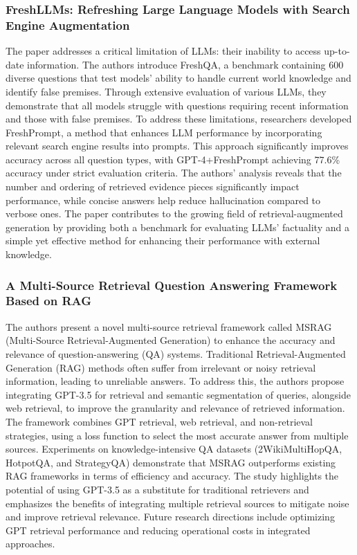 \documentclass[fleqn,moreauthors,10pt]{ds_report}
\begin{document}
\subsubsection{FreshLLMs: Refreshing Large Language Models with Search Engine Augmentation}

The paper addresses a critical limitation of LLMs: their inability to access up-to-date information. The authors introduce FreshQA, a benchmark containing 600 diverse questions that test models’ ability to handle current world knowledge and identify false premises. Through extensive evaluation of various LLMs, they demonstrate that all models struggle with questions requiring recent information and those with false premises.
To address these limitations, researchers developed FreshPrompt, a method that enhances LLM performance by incorporating relevant search engine results into prompts. This approach significantly improves accuracy across all question types, with GPT-4+FreshPrompt achieving 77.6\% accuracy under strict evaluation criteria. The authors’ analysis reveals that the number and ordering of retrieved evidence pieces significantly impact performance, while concise answers help reduce hallucination compared to verbose ones.
The paper contributes to the growing field of retrieval-augmented generation by providing both a benchmark for evaluating LLMs’ factuality and a simple yet effective method for enhancing their performance with external knowledge. \cite{vu2023}

\subsubsection{A Multi-Source Retrieval Question Answering
Framework Based on RAG}

The authors present a novel multi-source retrieval framework called MSRAG (Multi-Source Retrieval-Augmented Generation) to enhance the accuracy and relevance of question-answering (QA) systems. Traditional Retrieval-Augmented Generation (RAG) methods often suffer from irrelevant or noisy retrieval information, leading to unreliable answers. To address this, the authors propose integrating GPT-3.5 for retrieval and semantic segmentation of queries, alongside web retrieval, to improve the granularity and relevance of retrieved information. The framework combines GPT retrieval, web retrieval, and non-retrieval strategies, using a loss function to select the most accurate answer from multiple sources. Experiments on knowledge-intensive QA datasets (2WikiMultiHopQA, HotpotQA, and StrategyQA) demonstrate that MSRAG outperforms existing RAG frameworks in terms of efficiency and accuracy. The study highlights the potential of using GPT-3.5 as a substitute for traditional retrievers and emphasizes the benefits of integrating multiple retrieval sources to mitigate noise and improve retrieval relevance. Future research directions include optimizing GPT retrieval performance and reducing operational costs in integrated approaches. \cite{wu2024}
\end{document}
